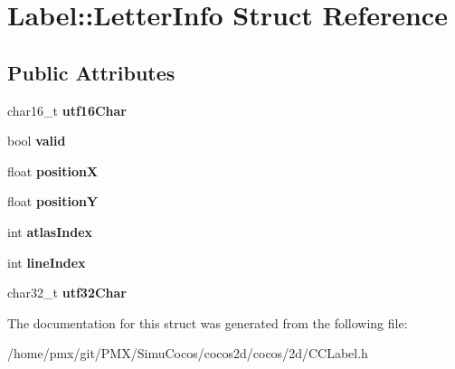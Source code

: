 \hypertarget{structLabel_1_1LetterInfo}{}\section{Label\+:\+:Letter\+Info Struct Reference}
\label{structLabel_1_1LetterInfo}
\subsection*{Public Attributes}
\begin{DoxyCompactItemize}
\item 
\mbox{\label{structLabel_1_1LetterInfo_acb4952b0fe3c5c8f5d17e593fd47fbfc}} 
char16\+\_\+t {\bfseries utf16\+Char}
\item 
\mbox{\label{structLabel_1_1LetterInfo_a21785fee153baf5a3ac2e9c2020aeb0f}} 
bool {\bfseries valid}
\item 
\mbox{\label{structLabel_1_1LetterInfo_a040e04f6d51747173245c7e863178b00}} 
float {\bfseries positionX}
\item 
\mbox{\label{structLabel_1_1LetterInfo_aea73de9f4e00ad742f10d0accd7d4b14}} 
float {\bfseries positionY}
\item 
\mbox{\label{structLabel_1_1LetterInfo_adf637ee1fff1b3bf9380867ff6b56740}} 
int {\bfseries atlas\+Index}
\item 
\mbox{\label{structLabel_1_1LetterInfo_aee8ac593b180cf487e910a4932b762c2}} 
int {\bfseries line\+Index}
\item 
\mbox{\label{structLabel_1_1LetterInfo_a8e2dc109368f6a1f18038e54f699b101}} 
char32\+\_\+t {\bfseries utf32\+Char}
\end{DoxyCompactItemize}


The documentation for this struct was generated from the following file\+:\begin{DoxyCompactItemize}
\item 
/home/pmx/git/\+P\+M\+X/\+Simu\+Cocos/cocos2d/cocos/2d/C\+C\+Label.\+h\end{DoxyCompactItemize}
